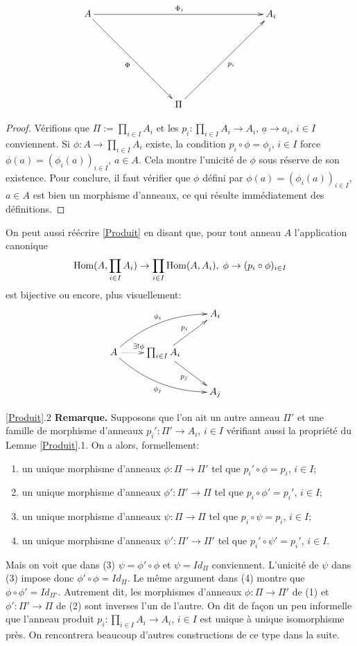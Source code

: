 \documentclass[a4paper, oneside, 12pt]{book}
\theoremstyle{definition} %
\begin{document}
	$$ \xymatrix@=80px{ A \ar[rr]^{\Phi_i} \ar[rd]_\Phi && A_i \\ & \Pi  \ar[ru]_{p_i}} $$

\begin{proof} Vérifions que $\Pi:= \prod_{i\in I}A_i$ et les $p_i:\prod_{i\in I}A_i\rightarrow A_i$, $\underline{a}\rightarrow a_i$, $i\in I$ conviennent. Si $\phi:A\rightarrow \prod_{i\in I}A_i$ existe, la condition $p_i\circ \phi =\phi_i$, $i\in I$ force  
$\phi(a)=(\phi_i(a))_{i\in I}$, $a\in A$. Cela montre l'unicité de $\phi$  sous réserve de son existence. Pour conclure, il faut vérifier que $\phi$ défini par  $\phi(a)=(\phi_i(a))_{i\in I}$, $a\in A$ est bien un morphisme d'anneaux, ce qui résulte immédiatement des définitions.
\end{proof}

 On peut aussi réécrire \ref{Produit} en disant que, pour tout anneau $A$  l'application  canonique
$$\hbox{\rm Hom}(A,\prod_{i\in I}A_{i})\rightarrow \prod_{i\in I}\hbox{\rm Hom} (A,A_{i}), \; \phi\rightarrow (p_i\circ \phi)_{i\in I}$$
 est bijective ou encore, plus visuellement:
$$\xymatrix{&&A_i \\
A\ar@{.>}[r]^{\exists ! \phi}\ar@/^1pc/[urr]^{\phi_i}\ar@/_1pc/[drr]_{\phi_j}&\prod_{i\in I}A_i\ar[ur]^{p_i}\ar[dr]_{p_j}\\
&&A_j& }$$

\ref{Produit}.2 \textbf{Remarque.} Supposons que l'on ait un autre anneau  $\Pi'$ et une famille de morphisme d'anneaux $p_i':\Pi'\rightarrow A_i$, $i\in I$ vérifiant aussi la propriété du Lemme \ref{Produit}.1. On a alors, formellement:
\begin{enumerate}[leftmargin=* ,parsep=0cm,itemsep=0cm,topsep=0cm]
\item un unique morphisme d'anneaux $\phi:\Pi\rightarrow \Pi'$ tel que $p_i'\circ \phi=p_i$, $i\in I$;
\item un unique morphisme d'anneaux $\phi':\Pi'\rightarrow \Pi$ tel que $p_i\circ \phi'=p_i'$, $i\in I$;
\item un unique morphisme d'anneaux $\psi:\Pi\rightarrow \Pi$ tel que $p_i\circ \psi=p_i$, $i\in I$;
\item un unique morphisme d'anneaux $\psi':\Pi'\rightarrow \Pi'$ tel que $p_i'\circ \psi'=p_i'$, $i\in I$.
\end{enumerate}
 Mais on voit que dans (3) $\psi=\phi'\circ \phi$ et $\psi=Id_\Pi$ conviennent. L'unicité de $\psi$ dans (3) impose donc $\phi'\circ \phi=Id_\Pi$. Le même argument dans (4) montre que $\phi\circ \phi'=Id_{\Pi'}$. Autrement dit, les morphismes d'anneaux $\phi:\Pi\rightarrow \Pi'$ de (1) et $\phi':\Pi'\rightarrow \Pi$ de (2) sont inverses l'un de l'autre. On dit de fa\c{c}on un peu informelle que l'anneau produit  $p_i:\prod_{i\in I}A_i\rightarrow A_i$, $i\in I$ est unique à unique isomorphisme près. On rencontrera beaucoup d'autres constructions de ce type dans la suite.\\
\end{document}
